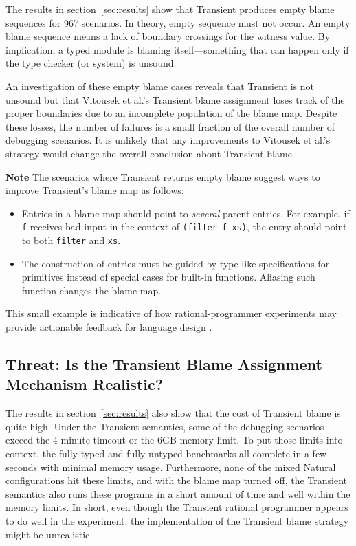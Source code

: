The results in section~\ref{sec:results} show that Transient produces empty
blame sequences for 967 scenarios. In theory, empty sequence must not occur. An
empty blame sequence means a lack of boundary crossings for the witness value.
By implication, a typed module is blaming itself---something that can
happen only if the type checker (or system) is unsound.

An investigation of these empty blame cases reveals that Transient is not
unsound but that Vitousek et al.'s Transient blame assignment loses track
of the proper boundaries due to an incomplete population of the blame map.
Despite these losses, the number of failures is a small fraction of the
overall number of debugging scenarios. It is unlikely that any
improvements to Vitousek et al.'s strategy would change the overall
conclusion about Transient blame.

{\bf Note} The scenarios where Transient returns empty blame 
suggest ways to improve Transient's blame map as follows:
\begin{itemize}

\item Entries in a blame map should point to {\em several\/} parent entries.
 For example, if \texttt{f} receives bad input in the context of {\tt (filter f
 xs)}, the entry should point to both \texttt{filter} and \texttt{xs}.

\item The construction of entries must be guided by type-like specifications for
 primitives instead of special cases for built-in functions. Aliasing such
 function changes the blame map.

\end{itemize}
This small example is indicative of how rational-programmer experiments may
provide actionable feedback for language design . 


\subsection{Threat: Is the Transient Blame Assignment Mechanism Realistic?}
\label{sec:threat:transient2}

The results in section~\ref{sec:results} also show that the cost of Transient
blame is quite high. Under the Transient semantics, some of the debugging
scenarios exceed the 4-minute timeout or the 6GB-memory limit. To put those
limits into context, the fully typed and fully untyped benchmarks all complete
in a few seconds with minimal memory usage. Furthermore, none of the mixed
Natural configurations hit these limits, and with the blame map turned off,
the Transient semantics also runs these programs in a short amount of time and
well within the memory limits. In short, even though the Transient rational
programmer appears to do well in the experiment, the implementation of the
Transient blame strategy might be unrealistic. 

